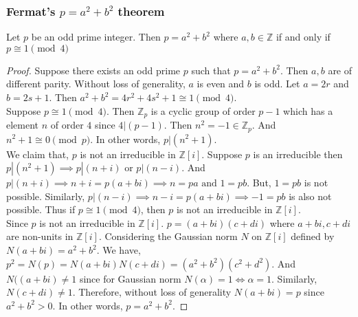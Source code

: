 \subsubsection{Fermat's $p = a^2+b^2$ theorem}
\begin{theorem}[Fermat]
	Let $p$ be an odd prime integer.
	Then $p = a^2 + b^2$ where $a,b \in \mathbb{Z}$ if and only if $p \cong 1 \pmod{4}$
\end{theorem}
\begin{proof}
	Suppose there exists an odd prime $p$ such that $p = a^2 + b^2$.
	Then $a,b$ are of different parity.
	Without loss of generality, $a$ is even and $b$ is odd.
	Let $a=2r$ and $b=2s+1$.
	Then $a^2+b^2 = 4r^2 + 4s^2 + 1 \cong 1 \pmod{4}$.\\

	Suppose $p \cong 1 \pmod{4}$.
	Then $\mathbb{Z}_p$ is a cyclic group of order $p-1$ which has a element $n$ of order $4$ since $4|(p-1)$.
	Then $n^2 = -1 \in \mathbb{Z}_p$.
	And $n^2+1 \cong 0 \pmod{p}$.
	In other words, $p | (n^2+1)$.\\

	We claim that, $p$ is not an irreducible in $\mathbb{Z}[i]$.
	Suppose $p$ is an irreducible then $p|(n^2+1) \implies p|(n+i)$ or $p|(n-i)$.
	And $p|(n+i) \implies n+i = p(a+bi) \implies n= pa \text{ and }1 = pb$.
	But, $1=pb$ is not possible.
	Similarly, $p|(n-i) \implies n-i = p(a+bi) \implies -1 = pb$ is also not possible.
	Thus if $p \cong 1 \pmod{4}$, then $p$ is not an irreducible in $\mathbb{Z}[i]$.\\

	Since $p$ is not an irreducible in $\mathbb{Z}[i]$.
	$p = (a+bi)(c+di)$ where $a+bi,c+di$ are non-units in $\mathbb{Z}[i]$.
	Considering the Gaussian norm $N$ on $\mathbb{Z}[i]$ defined by $N(a+bi) = a^2 + b^2$.
	We have, $p^2 = N(p) = N(a+bi)N(c+di) = (a^2+b^2)(c^2+d^2)$.
	And $N((a+bi) \ne 1$ since for Gaussian norm $N(\alpha) = 1 \iff \alpha = 1$.
	Similarly, $N(c+di) \ne 1$.
	Therefore, without loss of generality $N(a+bi) = p$ since $a^2+b^2 > 0$.
	In other words, $p = a^2 + b^2$.
\end{proof}
